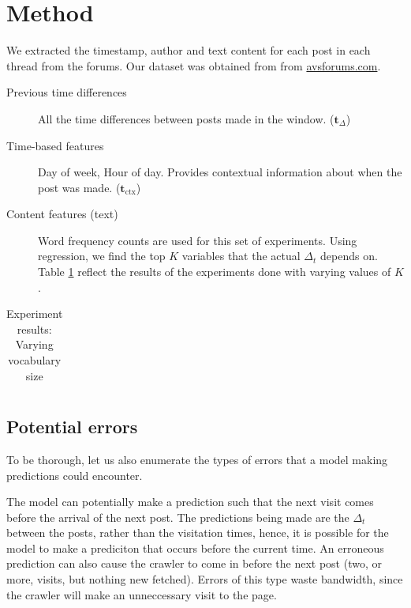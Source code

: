 \documentclass[12 pt]{article}
\begin{document}
\newcommand{\vocab}{\mathbf{v}}
\newcommand{\dtvec}{\mathbf{t}_\Delta}
\newcommand{\ctxvec}{\mathbf{t}_\text{ctx}}
\newcommand{\dt}{\Delta_t}
\newcommand{\prerror}{Pr_{error}}
\newcommand{\fvec}{\mathbf{x}}
\newcommand{\weights}{\mathbf{w}}
\newcommand{\X}{\mathbf{X}}
\section{Method}
We extracted the timestamp, author and text content for each post in each thread
from the forums. Our dataset was obtained from from \url{avsforums.com}.
\begin{description}
	\item[Previous time differences] All the time differences between posts made in the window. ($\dtvec$)
	\item[Time-based features] Day of week, Hour of day. Provides contextual information about when the post was made. ($\ctxvec$)
	
	\item[Content features (text)]
		Word frequency counts are used for this set of experiments. Using regression, we find the top $K$ variables that the actual $\dt$ depends on. Table \ref{vocab_exp} reflect the results of the experiments done with varying values of $K$.

\end{description}


\begin{table}
	\footnotesize
	\begin{centering}
	\begin{tabular}{|l|c|c|c|c|c|c|c|c|}
	\hline
	
	\hline
	\end{tabular}
	\caption{Experiment results: Varying vocabulary size}
	\label{vocab_exp}
\end{centering}
\end{table}

\subsection{Potential errors}
To be thorough, let us also enumerate the types of errors that a model making predictions could encounter.

The model can potentially make a prediction such that the next visit comes before the arrival of the next post. The predictions being made are the $\dt$ between the posts, rather than the visitation times, hence, it is possible for the model to make a prediciton that occurs before the current time. An erroneous prediction can also cause the crawler to come in before the next post (two, or more, visits, but nothing new fetched). Errors of this type waste bandwidth, since the crawler will make an unneccessary visit to the page.
\end{document}
